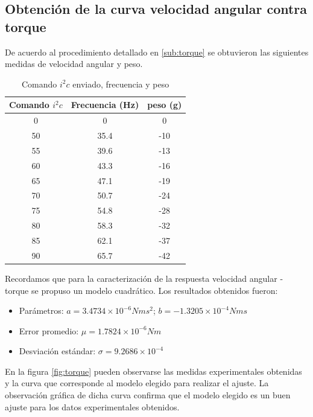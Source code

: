 \documentclass[main]{subfiles}
\begin{document}
\subsection{Obtenci\'on de la curva velocidad angular contra torque}

De acuerdo al procedimiento detallado en \ref{sub:torque} se obtuvieron las siguientes medidas de velocidad angular y peso.


\begin{table}[h]
\centering
\begin{tabular}{|c|c|c|} 
	\hline
	\cellcolor[gray]{0.8} \textbf{Comando $i^2c$} & 
	\cellcolor[gray]{0.8} \textbf{Frecuencia (Hz)} & \cellcolor[gray]{0.8} \textbf{peso (g)} \\ \hline \hline
	  0 & 0    & 0 \\ \hline
	 50 & 35.4 & -10 \\ \hline
	 55 & 39.6 & -13 \\ \hline
	 60 & 43.3 & -16  \\ \hline
     65 & 47.1 & -19\\ \hline
     70 & 50.7 & -24 \\ \hline
	 75 & 54.8 & -28 \\ \hline
	 80 & 58.3 & -32  \\ \hline
	 85 & 62.1 & -37\\ \hline     
     90 & 65.7 & -42\\ \hline          
\end{tabular}
\caption{Comando $i^2c$ enviado, frecuencia y peso}
\label{tab:torque}
\end{table}

Recordamos que para la caracterizaci\'on de la respuesta velocidad angular - torque se propuso un modelo cuadr\'atico. Los resultados obtenidos fueron:

\begin{itemize}
\item Par\'ametros: $a=3.4734\times10^{-6}Nms^2$; $b=-1.3205\times 10 ^{-4} Nms$
\item Error promedio: $\mu = 1.7824\times 10^{-6}Nm$
\item Desviaci\'on est\'andar: $\sigma = 9.2686\times 10^{-4}$ 
\end{itemize}

En la figura \ref{fig:torque} pueden observarse las medidas experimentales obtenidas y la curva que corresponde al modelo elegido para realizar el ajuste. La observaci\'on gr\'afica de dicha curva confirma que el modelo elegido es un buen ajuste para los datos experimentales obtenidos.
\end{document}
